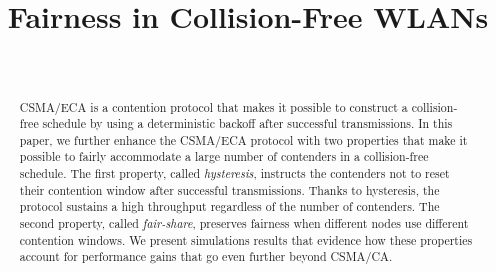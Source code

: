 \documentclass[conference]{IEEEtran}
\begin{document}
 \title{Fairness in Collision-Free WLANs}


  \author{
      \\
  }



\maketitle

\begin{abstract}

\boldmath CSMA/ECA is a contention protocol that makes it possible to construct a collision-free schedule by using a deterministic backoff after successful transmissions. In this paper, we further enhance the CSMA/ECA protocol with two properties that make it possible to fairly accommodate a large number of contenders in a collision-free schedule. The first property, called \emph{hysteresis}, instructs the contenders not to reset their contention window after successful transmissions. Thanks to hysteresis, the protocol sustains a high throughput regardless of the number of contenders. The second property, called \emph{fair-share}, preserves fairness when different nodes use different contention windows. We present simulations results that evidence how these properties account for performance gains that go even further beyond CSMA/CA.

\end{abstract}
\end{document}
